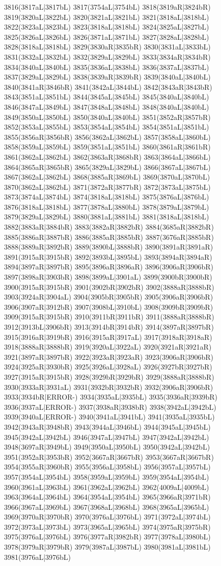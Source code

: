 3816(3817aL|3817bL) 3817(3754aL|3754bL) 3818(3819aR|3824bR) 3819(3820aL|3822bL) 3820(3821aL|3821bL) 3821(3818aL|3818bL) 3822(3823aL|3823bL) 3823(3818aL|3818bL) 3824(3825aL|3827bL) 3825(3826aL|3826bL) 3826(3871aL|3871bL) 3827(3828aL|3828bL) 3828(3818aL|3818bL) 3829(3830aR|3835bR) 3830(3831aL|3833bL) 3831(3832aL|3832bL) 3832(3829aL|3829bL) 3833(3834aR|3834bR) 3834(3840aL|3840bL) 3835(3836aL|3838bL) 3836(3837aL|3837bL) 3837(3829aL|3829bL) 3838(3839aR|3839bR) 3839(3840aL|3840bL) 3840(3841aR|3846bR) 3841(3842aL|3844bL) 3842(3843aR|3843bR) 3843(3851aL|3851bL) 3844(3845aL|3845bL) 3845(3840aL|3840bL) 3846(3847aL|3849bL) 3847(3848aL|3848bL) 3848(3840aL|3840bL) 3849(3850aL|3850bL) 3850(3840aL|3840bL) 3851(3852aR|3857bR) 3852(3853aL|3855bL) 3853(3854aL|3854bL) 3854(3851aL|3851bL) 3855(3856aR|3856bR) 3856(3862aL|3862bL) 3857(3858aL|3860bL) 3858(3859aL|3859bL) 3859(3851aL|3851bL) 3860(3861aR|3861bR) 3861(3862aL|3862bL) 3862(3863aR|3868bR) 3863(3864aL|3866bL) 3864(3865aR|3865bR) 3865(3829aL|3829bL) 3866(3867aL|3867bL) 3867(3862aL|3862bL) 3868(3885aR|3869bL) 3869(3870aL|3870bL) 3870(3862aL|3862bL) 3871(3872aR|3877bR) 3872(3873aL|3875bL) 3873(3874aL|3874bL) 3874(3818aL|3818bL) 3875(3876aL|3876bL) 3876(3818aL|3818bL) 3877(3878aL|3880bL) 3878(3879aL|3879bL) 3879(3829aL|3829bL) 3880(3881aL|3881bL) 3881(3818aL|3818bL) 3882(3883aR|3884bR) 3883(3882aR|3882bR) 3884(3685aR|3882bR) 3885(3886aR|3887bR) 3886(3885aR|3885bR) 3887(3676aR|3885bR) 3888(3889aR|3892bR) 3889(3890bL|3888bR) 3890(3891aR|3891aR) 3891(3915aR|3915bR) 3892(3893bL|3895bL) 3893(3894aR|3894aR) 3894(3897aR|3897bR) 3895(3896aR|3896aR) 3896(3906aR|3906bR) 3897(3898aR|3903bR) 3898(3899aL|3901aL) 3899(3900bR|3900bR) 3900(3915aR|3915bR) 3901(3902bR|3902bR) 3902(3888aR|3888bR) 3903(3924aR|3904aL) 3904(3905bR|3905bR) 3905(3906aR|3906bR) 3906(3907aR|3912bR) 3907(3908bL|3910bL) 3908(3909bR|3909bR) 3909(3915aR|3915bR) 3910(3911bR|3911bR) 3911(3888aR|3888bR) 3912(3913bL|3906bR) 3913(3914bR|3914bR) 3914(3897aR|3897bR) 3915(3916aR|3919bR) 3916(3915aR|3917aL) 3917(3918aR|3918aR) 3918(3888aR|3888bR) 3919(3920aL|3922aL) 3920(3921aR|3921aR) 3921(3897aR|3897bR) 3922(3923aR|3923aR) 3923(3906aR|3906bR) 3924(3925aR|3930bR) 3925(3926aL|3928aL) 3926(3927bR|3927bR) 3927(3915aR|3915bR) 3928(3929bR|3929bR) 3929(3888aR|3888bR) 3930(3933aR|3931aL) 3931(3932bR|3932bR) 3932(3906aR|3906bR) 3933(3934bR|ERROR-) 3934(3935aL|3935bL) 3935(3936aR|3939bR) 3936(3937aL|ERROR-) 3937(3938aR|3938bR) 3938(3942aL|3942bL) 3939(3940aL|ERROR-) 3940(3941aL|3941bL) 3941(3935aL|3935bL) 3942(3943aR|3948bR) 3943(3944aL|3946bL) 3944(3945aL|3945bL) 3945(3942aL|3942bL) 3946(3947aL|3947bL) 3947(3942aL|3942bL) 3948(3697aR|3949bL) 3949(3950aL|3950bL) 3950(3942aL|3942bL) 3951(3952aR|3953bR) 3952(3667aR|3667bR) 3953(3667aR|3667bR) 3954(3955aR|3960bR) 3955(3956aL|3958bL) 3956(3957aL|3957bL) 3957(3954aL|3954bL) 3958(3959aL|3959bL) 3959(3954aL|3954bL) 3960(3961aL|3963bL) 3961(3962aL|3962bL) 3962(4009aL|4009bL) 3963(3964aL|3964bL) 3964(3954aL|3954bL) 3965(3966aR|3971bR) 3966(3967aL|3969bL) 3967(3968aL|3968bL) 3968(3965aL|3965bL) 3969(3970aR|3970bR) 3970(3976aL|3976bL) 3971(3972aL|3974bL) 3972(3973aL|3973bL) 3973(3965aL|3965bL) 3974(3975aR|3975bR) 3975(3976aL|3976bL) 3976(3977aR|3982bR) 3977(3978aL|3980bL) 3978(3979aR|3979bR) 3979(3987aL|3987bL) 3980(3981aL|3981bL) 3981(3976aL|3976bL) 